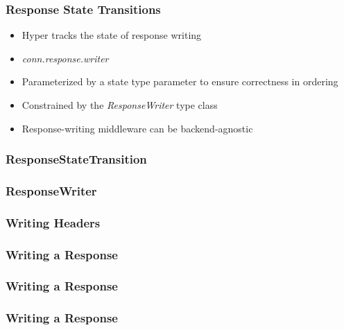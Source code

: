 \begin{frame}
  \frametitle{Response State Transitions}
  \begin{itemize}
    \pause
    \item<+-> Hyper tracks the state of response writing
    \item<+-> \textit{conn.response.writer}
    \item<+-> Parameterized by a state type parameter to ensure correctness in ordering
    \item<+-> Constrained by the \textit{ResponseWriter} type class
    \item<+-> Response-writing middleware can be backend-agnostic
  \end{itemize}
\end{frame}

\begin{frame}
  \frametitle{ResponseStateTransition}
  
\end{frame}

\begin{frame}[fragile]
  \frametitle{ResponseWriter}
  
\end{frame}

\begin{frame}
  \frametitle{Writing Headers}
  
\end{frame}

\begin{frame}
  \frametitle{Writing a Response}
  
\end{frame}

\begin{frame}
  \frametitle{Writing a Response}
  
\end{frame}

\begin{frame}
  \frametitle{Writing a Response}
  
\end{frame}

